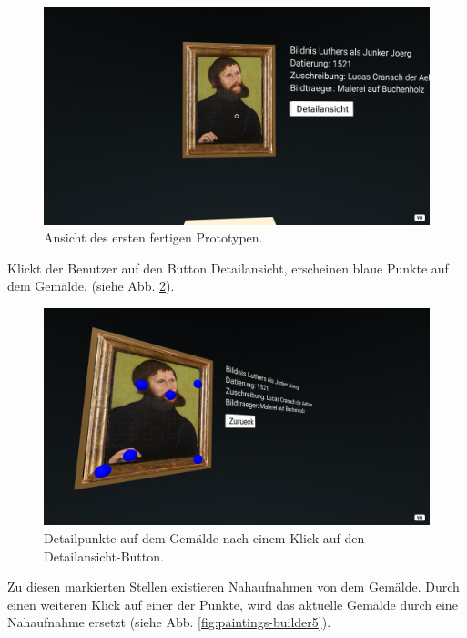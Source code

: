 \documentclass[a4paper,12pt,oneside]{article}
\begin{document}
        \begin{figure}
          \centering
          \includegraphics[scale=0.3]{img/coding/paintings-builder3.png}
          \caption{Ansicht des ersten fertigen Prototypen.}
          \label{fig:paintings-builder3}
        \end{figure}
        Klickt der Benutzer auf den Button \glqq Detailansicht\grqq{},
        erscheinen blaue Punkte auf dem Gemälde.
        (siehe Abb. \ref{fig:paintings-builder4}).
        \begin{figure}
          \centering
          \includegraphics[scale=0.3]{img/coding/paintings-builder4.png}
          \caption{Detailpunkte auf dem Gemälde nach einem Klick auf den \glqq Detailansicht\grqq{}-Button.}
          \label{fig:paintings-builder4}
        \end{figure}
        Zu diesen markierten Stellen existieren Nahaufnahmen von dem Gemälde.
        Durch einen weiteren Klick auf einer der Punkte, wird das
        aktuelle Gemälde durch eine Nahaufnahme ersetzt
        (siehe Abb. \ref{fig:paintings-builder5}).
\end{document}
